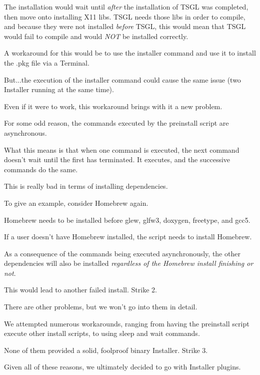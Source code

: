 The installation would wait until {\itshape after} the installation of T\-S\-G\-L was completed, then move onto installing {\ttfamily X11} libs. T\-S\-G\-L needs those libs in order to compile, and because they were not installed {\itshape before} T\-S\-G\-L, this would mean that T\-S\-G\-L would fail to compile and would {\itshape N\-O\-T} be installed correctly.

A workaround for this would be to use the {\ttfamily installer} command and use it to install the {\ttfamily .pkg} file via a Terminal.

But...the execution of the {\ttfamily installer} command could cause the same issue (two Installer running at the same time).

Even if it were to work, this workaround brings with it a new problem.

For some odd reason, the commands executed by the {\ttfamily preinstall} script are asynchronous.

What this means is that when one command is executed, the next command doesn't wait until the first has terminated. It executes, and the successive commands do the same.

This is really bad in terms of installing dependencies.

To give an example, consider {\ttfamily Homebrew} again.

{\ttfamily Homebrew} needs to be installed before {\ttfamily glew}, {\ttfamily glfw3}, {\ttfamily doxygen}, {\ttfamily freetype}, and {\ttfamily gcc5}.

If a user doesn't have {\ttfamily Homebrew} installed, the script needs to install {\ttfamily Homebrew}.

As a consequence of the commands being executed asynchronously, the other dependencies will also be installed {\itshape regardless of the {\ttfamily Homebrew} install finishing or not}.

This would lead to another failed install. Strike 2.

There are other problems, but we won't go into them in detail.

We attempted numerous workarounds, ranging from having the {\ttfamily preinstall} script execute other install scripts, to using {\ttfamily sleep} and {\ttfamily wait} commands.

None of them provided a solid, foolproof binary Installer. Strike 3.

Given all of these reasons, we ultimately decided to go with Installer plugins.

